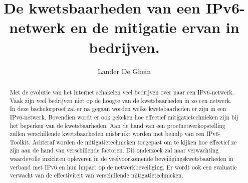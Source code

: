 \documentclass{hogent-article}
\title{De kwetsbaarheden van een IPv6-netwerk en de mitigatie ervan in bedrijven. }
\author{Lander De Ghein}
\begin{document}
\begin{abstract}
  Met de evolutie van het internet schakelen veel bedrijven over naar een IPv6-netwerk. Vaak zijn veel 
  bedrijven niet op de hoogte van de kwetsbaarheden in zo een netwerk. In deze bachelorproef zal er na gegaan worden welke kwetsbaarheden er zijn in een IPv6-netwerk. Bovendien wordt er ook gekeken hoe effectief mitigatietechnieken zijn bij het beperken van de kwetsbaarheden. Aan de hand van een proefnetwerkopstelling zullen verschillende kwetsbaarheden misbruikt worden met behulp van een IPv6-Toolkit. Achteraf worden de mitigatietechnieken toegepast om te kijken hoe effectief ze zijn aan de hand van verschillende factoren. Dit onderzoek zal naar verwachting waardevolle inzichten opleveren in de veelvoorkomende beveiligingskwetsbaarheden in verband met IPv6 en hun impact op de netwerkbeveiliging. Er wordt ook een evaluatie verwacht van de effectiviteit van verschillende mitigatietechnieken.
\end{abstract}

\tableofcontents



\printbibliography[heading=bibintoc]
\end{document}
